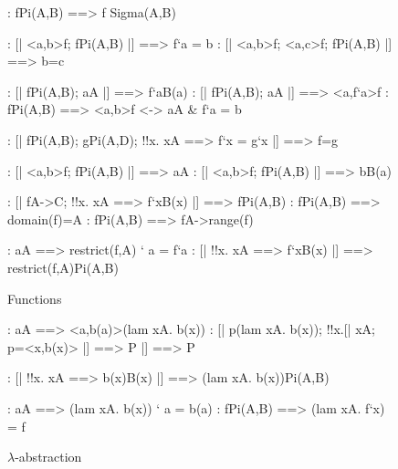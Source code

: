 \begin{figure}
\begin{alltt*}\isastyleminor
{}:     f\isasymin{}Pi(A,B) ==> f \isasymsubseteq Sigma(A,B)

: [| <a,b>\isasymin{}f; f\isasymin{}Pi(A,B) |] ==> f`a = b
: [| <a,b>\isasymin{}f; <a,c>\isasymin{}f; f\isasymin{}Pi(A,B) |] ==> b=c

:     [| f\isasymin{}Pi(A,B); a\isasymin{}A |] ==> f`a\isasymin{}B(a)
:     [| f\isasymin{}Pi(A,B); a\isasymin{}A |] ==> <a,f`a>\isasymin{}f
:      f\isasymin{}Pi(A,B) ==> <a,b>\isasymin{}f <-> a\isasymin{}A & f`a = b

:  [| f\isasymin{}Pi(A,B); g\isasymin{}Pi(A,D);
                   !!x. x\isasymin{}A ==> f`x = g`x     |] ==> f=g

:    [| <a,b>\isasymin{}f; f\isasymin{}Pi(A,B) |] ==> a\isasymin{}A
:     [| <a,b>\isasymin{}f; f\isasymin{}Pi(A,B) |] ==> b\isasymin{}B(a)

:        [| f\isasymin{}A->C; !!x. x\isasymin{}A ==> f`x\isasymin{}B(x) |] ==> f\isasymin{}Pi(A,B)
:  f\isasymin{}Pi(A,B) ==> domain(f)=A
:   f\isasymin{}Pi(A,B) ==> f\isasymin{}A->range(f)

:       a\isasymin{}A ==> restrict(f,A) ` a = f`a
:  [| !!x. x\isasymin{}A ==> f`x\isasymin{}B(x) |] ==> 
                restrict(f,A)\isasymin{}Pi(A,B)
\end{alltt*}
\caption{Functions} \label{zf-func1}
\end{figure}


\begin{figure}
\begin{alltt*}\isastyleminor
{}:     a\isasymin{}A ==> <a,b(a)>\isasymin{}(lam x\isasymin{}A. b(x))
:     [| p\isasymin{}(lam x\isasymin{}A. b(x)); !!x.[| x\isasymin{}A; p=<x,b(x)> |] ==> P 
          |] ==>  P

: [| !!x. x\isasymin{}A ==> b(x)\isasymin{}B(x) |] ==> (lam x\isasymin{}A. b(x))\isasymin{}Pi(A,B)

:     a\isasymin{}A ==> (lam x\isasymin{}A. b(x)) ` a = b(a)
:      f\isasymin{}Pi(A,B) ==> (lam x\isasymin{}A. f`x) = f
\end{alltt*}
\caption{$\lambda$-abstraction} \label{zf-lam}
\end{figure}


